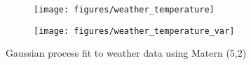 \documentclass[10pt]{article}
\begin{document}
\begin{enumerate}[label=(\Alph*)]
            \begin{figure}
                \begin{subfigure}{.5\textwidth}
                  \centering
                  \texttt{[image: figures/weather\_temperature]}
                \end{subfigure}%
                \begin{subfigure}{.5\textwidth}
                  \centering
                  \texttt{[image: figures/weather\_temperature\_var]}
                \end{subfigure}
            \caption{Gaussian process fit to weather data using Matern (5,2)}
            \label{fig:weather_temperature}
            \end{figure}
        

        \end{enumerate}
\end{document}
